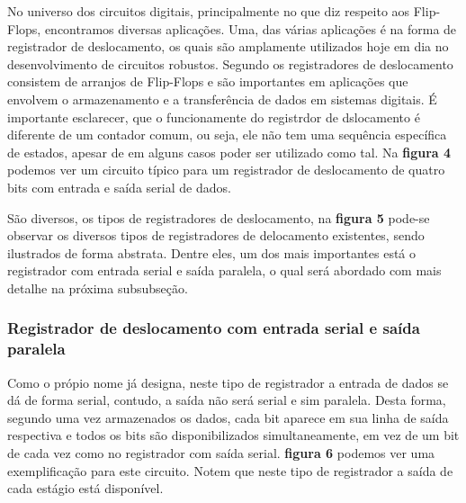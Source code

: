\documentclass[12pt]{article}
\begin{document}
No universo dos circuitos digitais, principalmente no que diz respeito aos Flip-Flops, encontramos diversas aplicações. Uma, das várias aplicações é na forma de registrador de deslocamento, os quais são amplamente utilizados hoje em dia no desenvolvimento de circuitos robustos. Segundo \cite{floyd2011digital} os registradores de deslocamento consistem de arranjos de Flip-Flops e são importantes em aplicações que envolvem o armazenamento e a transferência de dados em sistemas digitais. É importante esclarecer, que o funcionamente do registrdor de dslocamento é diferente de um contador comum, ou seja, ele não tem uma sequência específica de estados, apesar de em alguns casos poder ser utilizado como tal. Na \textbf{figura 4} podemos ver um circuito típico para um registrador de deslocamento de quatro bits com entrada e saída serial de dados.


São diversos, os tipos de registradores de deslocamento, na \textbf{figura 5} pode-se observar os diversos tipos de registradores de delocamento existentes, sendo ilustrados de forma abstrata. Dentre eles, um dos mais importantes está o registrador com entrada serial e saída paralela, o qual será abordado com mais detalhe na próxima subsubseção.




\subsubsection{Registrador de deslocamento com entrada serial e saída paralela}

Como o própio nome já designa, neste tipo de registrador a entrada de dados se dá de forma serial, contudo, a saída não será serial e sim paralela. Desta forma, segundo \cite{floyd2011digital} uma vez armazenados os dados, cada bit aparece em sua linha de saída respectiva e todos os bits são disponibilizados simultaneamente, em vez de um bit de cada vez como no registrador com saída serial. \textbf{figura 6} podemos ver uma exemplificação para este circuito. Notem que neste tipo de registrador a saída de cada estágio está disponível.

\end{document}
